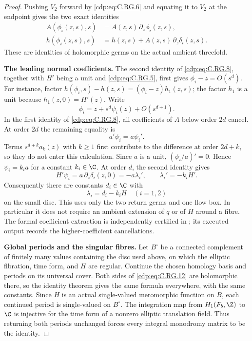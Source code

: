 \begin{proof}
Pushing $V_2$ forward by \eqref{cdp:eq:C.RG.6} and equating it to
$V_2$ at the endpoint gives the two exact identities
\[
 \begin{split}
 A(\phi_i(z,s),s)&=A(z,s)\,\partial_z\phi_i(z,s),\\
 h(\phi_i(z,s),s)&=h(z,s)+A(z,s)\,\partial_z\delta_i(z,s).
 \end{split}                                                   \tag{C.RG.8}\label{cdp:eq:C.RG.8}
\]
These are identities of holomorphic germs on the actual
ambient threefold.

\par\medskip\noindent\textbf{The leading normal coefficients.}
The second identity of \eqref{cdp:eq:C.RG.8}, together with $H'$ being
a unit and \eqref{cdp:eq:C.RG.5}, first gives
$\phi_i-z=O(s^d)$. For instance, factor
$h(\phi_i,s)-h(z,s)=(\phi_i-z)h_1(z,s)$;
the factor $h_1$ is a unit because $h_1(z,0)=H'(z)$.
Write
\[
                \phi_i=z+s^d\psi_i(z)+O(s^{d+1}).
                                                               \tag{C.RG.9}\label{cdp:eq:C.RG.9}
\]
In the first identity of \eqref{cdp:eq:C.RG.8}, all coefficients
of $A$ below order $2d$ cancel. At order $2d$ the
remaining equality is
\[
                         a'\psi_i=a\psi_i'.
                                                               \tag{C.RG.10}\label{cdp:eq:C.RG.10}
\]
Terms $s^{d+k}a_k(z)$ with $k\ge1$ first contribute
to the difference at order $2d+k$, so they do not
enter this calculation. Since $a$ is a unit,
$(\psi_i/a)'=0$. Hence $\psi_i=k_i a$ for a constant
$k_i\in\C$. At order $d$, the second identity gives
\[
 H'\psi_i=a\,\partial_z\delta_i(z,0)
          =-a\lambda_i',\qquad
             \lambda_i'= -k_i H'.
                                                               \tag{C.RG.11}\label{cdp:eq:C.RG.11}
\]
Consequently there are constants $d_i\in\C$ with
\[
                         \lambda_i=d_i-k_iH
                    \quad(i=1,2)
                                                               \tag{C.RG.12}\label{cdp:eq:C.RG.12}
\]
on the small disc. This uses only the two return germs
and one flow box. In particular it does not require
an ambient extension of $q$ or of $H$ around a fibre.
The formal coefficient extraction is independently
certified in ; its executed
output records the higher-coefficient cancellations.

\par\medskip\noindent\textbf{Global periods and the singular fibres.}
Let $B^\circ$ be a connected complement of finitely
many values containing the disc used above, on which
the elliptic fibration, time form, and $H$ are regular.
Continue the chosen homology basis and periods on its
universal cover. Both sides of \eqref{cdp:eq:C.RG.12} are holomorphic
there, so the identity theorem gives the same formula
everywhere, with the same constants. Since $H$ is an
actual single-valued meromorphic function on $B$, each
continued period is single-valued on $B^\circ$.
The integration map from $H_1(F_b,\Z)$ to $\C$ is
injective for the time form of a nonzero elliptic
translation field. Thus returning both periods
unchanged forces every integral monodromy matrix to
be the identity.


\end{proof}
